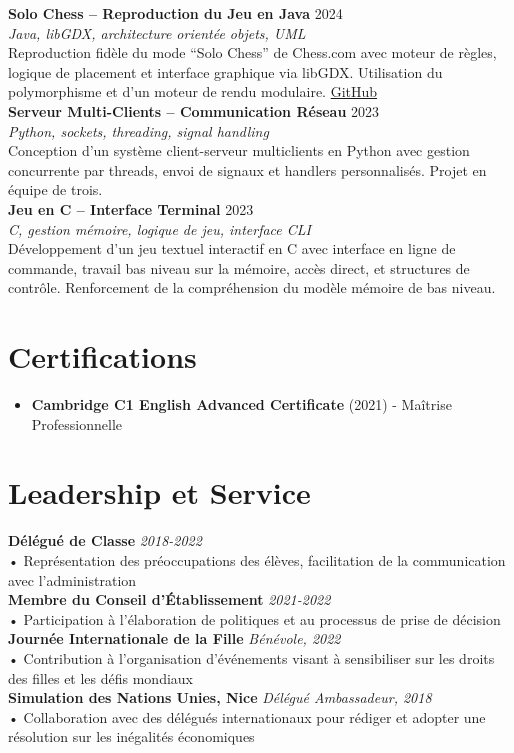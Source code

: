 \documentclass[a4paper,10pt]{article}
\begin{document}
\textbf{Solo Chess – Reproduction du Jeu en Java} \hfill 2024 \\
\textit{Java, libGDX, architecture orientée objets, UML} \\
Reproduction fidèle du mode “Solo Chess” de Chess.com avec moteur de règles, logique de placement et interface graphique via libGDX. Utilisation du polymorphisme et d’un moteur de rendu modulaire. \href{https://github.com/TerminalGambit/PCOO-projetfinal}{GitHub}\\
\textbf{Serveur Multi-Clients – Communication Réseau} \hfill 2023 \\
\textit{Python, sockets, threading, signal handling} \\
Conception d’un système client-serveur multiclients en Python avec gestion concurrente par threads, envoi de signaux et handlers personnalisés. Projet en équipe de trois.\\
\textbf{Jeu en C – Interface Terminal} \hfill 2023 \\
\textit{C, gestion mémoire, logique de jeu, interface CLI} \\
Développement d’un jeu textuel interactif en C avec interface en ligne de commande, travail bas niveau sur la mémoire, accès direct, et structures de contrôle. Renforcement de la compréhension du modèle mémoire de bas niveau.

\section*{Certifications}
\begin{itemize}
    \item \textbf{Cambridge C1 English Advanced Certificate} (2021) - Maîtrise Professionnelle
\end{itemize}

\section*{Leadership et Service}
\textbf{Délégué de Classe} \hfill \textit{2018-2022}\\
• Représentation des préoccupations des élèves, facilitation de la communication avec l’administration\\
\textbf{Membre du Conseil d’Établissement} \hfill \textit{2021-2022}\\
• Participation à l’élaboration de politiques et au processus de prise de décision\\
\textbf{Journée Internationale de la Fille} \hfill \textit{Bénévole, 2022}\\
• Contribution à l’organisation d’événements visant à sensibiliser sur les droits des filles et les défis mondiaux\\
\textbf{Simulation des Nations Unies, Nice} \hfill \textit{Délégué Ambassadeur, 2018}\\
• Collaboration avec des délégués internationaux pour rédiger et adopter une résolution sur les inégalités économiques
\end{document}
